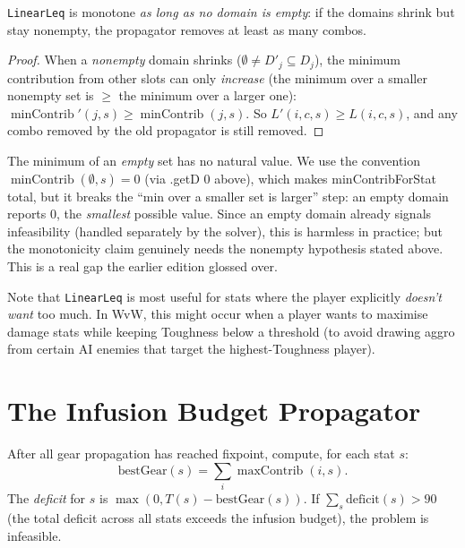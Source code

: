 \documentclass[11pt, a4paper, oneside]{book}
\newcommand{\maxContrib}{\operatorname{maxContrib}}
\newcommand{\minContrib}{\operatorname{minContrib}}
\newcommand{\li}[1]{{\ttfamily\small\color{deepblue}#1}}
\begin{document}
\begin{propbox}[title={Monotonicity of LinearLeq (nonempty domains)}]
\texttt{LinearLeq} is monotone \emph{as long as no domain is empty}: if the
domains shrink but stay nonempty, the propagator removes at least as many combos.
\end{propbox}

\begin{proof}
When a \emph{nonempty} domain shrinks ($\emptyset \neq D'_j \subseteq D_j$), the
minimum contribution from other slots can only \emph{increase} (the minimum over
a smaller nonempty set is $\geq$ the minimum over a larger one):
$\minContrib'(j, s) \geq \minContrib(j, s)$.
So $L'(i, c, s) \geq L(i, c, s)$, and any combo removed by the old propagator
is still removed.
\end{proof}

\begin{warningbox}
The minimum of an \emph{empty} set has no natural value.  We use the convention
$\minContrib(\emptyset, s) = 0$ (via \li{.getD 0} above), which makes
\li{minContribForStat} total, but it breaks the ``min over a smaller set is
larger'' step: an empty domain reports $0$, the \emph{smallest} possible value.
Since an empty domain already signals infeasibility (handled separately by the
solver), this is harmless in practice; but the monotonicity claim genuinely
needs the nonempty hypothesis stated above.  This is a real gap the earlier
edition glossed over.
\end{warningbox}

Note that \texttt{LinearLeq} is most useful for stats where the player
explicitly \emph{doesn't want} too much.  In WvW, this might occur when
a player wants to maximise damage stats while keeping Toughness below a
threshold (to avoid drawing aggro from certain AI enemies that target the
highest-Toughness player).

\section{The Infusion Budget Propagator}

\begin{defbox}[title={Infusion Budget Propagator}]
After all gear propagation has reached fixpoint, compute, for each stat $s$:
\[
  \text{bestGear}(s) = \sum_i \maxContrib(i, s).
\]
The \emph{deficit} for $s$ is $\max(0, T(s) - \text{bestGear}(s))$.
If $\sum_s \text{deficit}(s) > 90$ (the total deficit across all stats
exceeds the infusion budget), the problem is infeasible.
\end{defbox}
\end{document}
